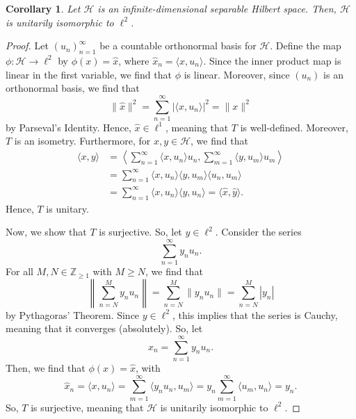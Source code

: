 \documentclass[a4paper, openany]{memoir}
\theoremstyle{definition}
\theoremstyle{plain}
\newtheorem{corollary}[definition]{Corollary}
\begin{document}
    \begin{corollary}
        Let $\mathcal{H}$ is an infinite-dimensional separable Hilbert space. Then, $\mathcal{H}$ is unitarily isomorphic to $\ell^2$.
    \end{corollary}
    \begin{proof}
        Let $(u_n)_{n=1}^\infty$ be a countable orthonormal basis for $\mathcal{H}$. Define the map $\phi \colon \mathcal{H} \to \ell^2$ by $\phi(x) = \hat{x}$, where $\hat{x}_n = \langle x, u_n\rangle$. Since the inner product map is linear in the first variable, we find that $\phi$ is linear. Moreover, since $(u_n)$ is an orthonormal basis, we find that
        \[\lVert \hat{x} \rVert^2 = \sum_{n=1}^\infty |\langle x, u_n \rangle|^2 = \lVert x \rVert^2\]
        by Parseval's Identity. Hence, $\hat{x} \in \ell^1$, meaning that $T$ is well-defined. Moreover, $T$ is an isometry. Furthermore, for $x, y \in \mathcal{H}$, we find that
        \begin{align*}
            \langle x, y \rangle &= \left\langle \sum_{n=1}^\infty \langle x, u_n \rangle u_n, \sum_{m=1}^\infty \langle y, u_m \rangle u_m \right\rangle \\
            &= \sum_{n=1}^\infty \langle x, u_n \rangle \langle y, u_m \rangle \langle u_n, u_m \rangle \\
            &= \sum_{n=1}^\infty \langle x, u_n \rangle \langle y, u_n \rangle = \langle \hat{x}, \hat{y} \rangle.
        \end{align*}
        Hence, $T$ is unitary.

        Now, we show that $T$ is surjective. So, let $y \in \ell^2$. Consider the series
        \[\sum_{n=1}^\infty y_n u_n.\]
        For all $M, N \in \mathbb{Z}_{\geq 1}$ with $M \geq N$, we find that
        \[\left\lVert \sum_{n=N}^M y_n u_n \right\rVert = \sum_{n=N}^M \lVert y_n u_n \rVert = \sum_{n=N}^M |y_n|\]
        by Pythagoras' Theorem. Since $y \in \ell^2$, this implies that the series is Cauchy, meaning that it converges (absolutely). So, let
        \[x_n = \sum_{n=1}^\infty y_n u_n.\]
        Then, we find that $\phi(x) = \hat{x}$, with
        \[\hat{x}_n = \langle x, u_n \rangle = \sum_{m=1}^\infty \langle y_n u_n, u_m \rangle = y_n \sum_{m=1}^\infty \langle u_m , u_n \rangle = y_n.\]
        So, $T$ is surjective, meaning that $\mathcal{H}$ is unitarily isomorphic to $\ell^2$.
    \end{proof}

    \newpage
\end{document}
